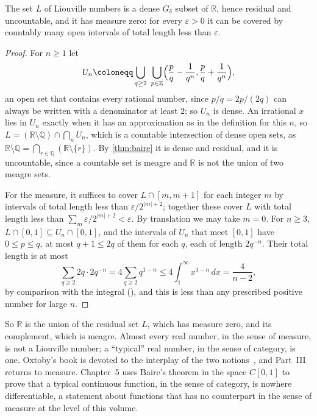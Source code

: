 \begin{proposition}
\label{prop:liouville-residual}
The set $L$ of Liouville numbers is a dense $G_\delta$ subset of $\mathbb R$, hence residual and uncountable, and it has measure zero: for every $\varepsilon>0$ it can be covered by countably many open intervals of total length less than $\varepsilon$.
\end{proposition}

\begin{proof}
For $n\ge1$ let
\[
U_n\coloneqq\bigcup_{q\ge2}\ \bigcup_{p\in\mathbb Z}\Bigl(\frac pq-\frac1{q^n},\frac pq+\frac1{q^n}\Bigr),
\]
an open set that contains every rational number, since $p/q=2p/(2q)$ can always be written with a denominator at least $2$; so $U_n$ is dense. An irrational $x$ lies in $U_n$ exactly when it has an approximation as in the definition for this $n$, so $L=(\mathbb R\setminus\mathbb Q)\cap\bigcap_nU_n$, which is a countable intersection of dense open sets, as $\mathbb R\setminus\mathbb Q=\bigcap_{r\in\mathbb Q}(\mathbb R\setminus\{r\})$. By \cref{thm:baire} it is dense and residual, and it is uncountable, since a countable set is meagre and $\mathbb R$ is not the union of two meagre sets.

For the measure, it suffices to cover $L\cap[m,m+1]$ for each integer $m$ by intervals of total length less than $\varepsilon/2^{|m|+2}$; together these cover $L$ with total length less than $\sum_m\varepsilon/2^{|m|+2}<\varepsilon$. By translation we may take $m=0$. For $n\ge3$, $L\cap[0,1]\subseteq U_n\cap[0,1]$, and the intervals of $U_n$ that meet $[0,1]$ have $0\le p\le q$, at most $q+1\le2q$ of them for each $q$, each of length $2q^{-n}$. Their total length is at most
\[
\sum_{q\ge2}2q\cdot2q^{-n}=4\sum_{q\ge2}q^{1-n}\le4\int_1^\infty x^{1-n}\,dx=\frac4{n-2},
\]
by comparison with the integral (), and this is less than any prescribed positive number for large $n$.
\end{proof}

So $\mathbb R$ is the union of the residual set $L$, which has measure zero, and its complement, which is meagre. Almost every real number, in the sense of measure, is not a Liouville number; a ``typical'' real number, in the sense of category, is one. Oxtoby's book is devoted to the interplay of the two notions~\cite{oxtoby1980}, and Part~III returns to measure. Chapter~5 uses Baire's theorem in the space $C[0,1]$ to prove that a typical continuous function, in the sense of category, is nowhere differentiable, a statement about functions that has no counterpart in the sense of measure at the level of this volume.

